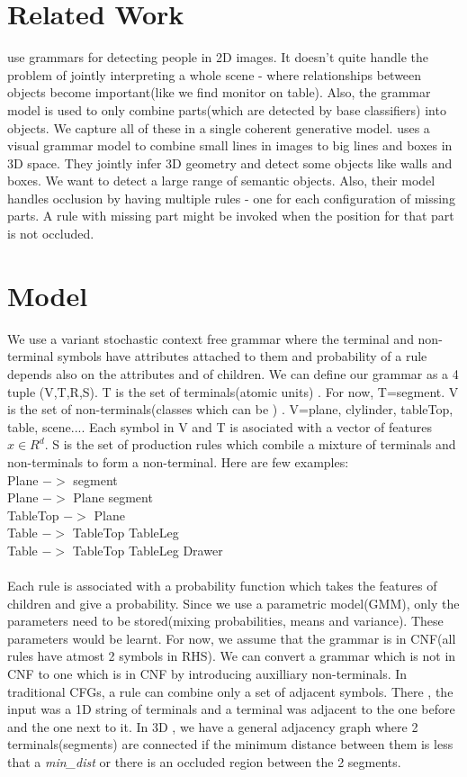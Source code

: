 \documentclass[11pt]{article} %
\begin{document}
\section{Related Work}
\cite{girshick2011object} use grammars for detecting people in 2D images. It doesn't quite handle the problem of jointly interpreting a whole scene - where relationships between objects become important(like we find monitor on table). Also, the grammar model is used to only combine parts(which are detected by base classifiers) into objects. We capture all of these in a single coherent generative model.
\cite{zhu2011} uses a visual grammar model to combine small lines in images to big lines and boxes in 3D space. They jointly infer 3D geometry and detect some objects like walls and boxes. We want to detect a large range of semantic objects. Also, their model handles occlusion by having multiple rules - one for each configuration of missing parts. A rule with missing part might be invoked when the position for that part is not occluded.
\section{Model}
We use a variant stochastic context free grammar where the terminal and non-terminal symbols have attributes attached to them and probability of a rule depends also on the attributes and of children. We can define our grammar as a 4 tuple (V,T,R,S). T is the set of terminals(atomic units) . For now, T={segment}. V is the set of non-terminals(classes which can be ) . V={plane, clylinder, tableTop, table, scene...}. Each symbol in V and T is asociated with a vector of features $x \in R^d$.
S is the set of production rules which combile a mixture of terminals and non-terminals to form a non-terminal. Here are few examples: \\
Plane $->$ segment\\
Plane $->$ Plane segment\\
TableTop $->$  Plane\\
Table  $->$ TableTop TableLeg\\
Table  $->$ TableTop TableLeg Drawer\\
\\
Each rule is associated with a probability function which takes the features of children and give a probability. Since we use a parametric model(GMM), only the parameters need to be stored(mixing probabilities, means and variance). These parameters would be learnt. For now, we assume that the grammar is in CNF(all rules have atmost 2 symbols in RHS). We can convert a grammar which is not in CNF to one which is in CNF by introducing auxilliary non-terminals.
In traditional CFGs, a rule can combine only a set of adjacent symbols. There , the input was a 1D string of terminals and a terminal was adjacent to the one before and the one next to it. In 3D , we have a general adjacency graph where 2 terminals(segments) are connected if the minimum distance between them is less that a {\it min\_dist} or there is an occluded region between the 2 segments.
\end{document}
